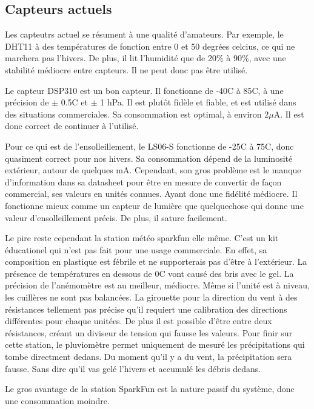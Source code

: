 
\subsection{Capteurs actuels}
Les capteutrs actuel se résument à une qualité d'amateurs.
Par exemple, le DHT11 à des températures de fonction entre 0 et 50 degrées celcius, ce qui ne marchera pas l'hivers.
De plus, il lit l'humidité que de 20\% à 90\%, avec une stabilité médiocre entre capteurs. Il ne peut donc pas être utilisé.

Le capteur DSP310 est un bon capteur. Il fonctionne de -40C à 85C, à une précision de $\pm$ 0.5C et $\pm$ 1 hPa.
Il est plutôt fidèle et fiable, et est utilisé dans des situations commerciales. Sa consommation est optimal, à environ 2$\mu$A.
Il est donc correct de continuer à l'utilisé.

Pour ce qui est de l'ensolleillement, le LS06-S fonctionne de -25C à 75C, donc quasiment correct pour nos hivers. Sa consommation
dépend de la luminosité extérieur, autour de quelques mA. Cependant, son gros problème est le manque d'information dans sa datasheet
pour être en mesure de convertir de façon commercial, ses valeurs en unités connues. Ayant donc une fidélité médiocre.
Il fonctionne mieux comme un capteur de lumière que quelquechose qui donne une valeur d'ensolleillement précis.
De plus, il sature facilement.

Le pire reste cependant la station météo sparkfun elle même. C'est un kit éducationel qui n'est pas fait pour une usage commerciale.
En effet, sa composition en plastique est fébrile et ne supporterais pas d'être à l'extérieur. La présence de températures en dessous
de 0C vont causé des bris avec le gel. La précision de l'anémomètre est au meilleur, médiocre. Même si l'unité est à niveau, les cuillères
ne sont pas balancées. La girouette pour la direction du vent à des résistances tellement pas précise qu'il requiert une calibration 
des directions différentes pour chaque unitées. De plus il est possible d'être entre deux résistances, créant un diviseur de tension qui
fausse les valeurs. Pour finir sur cette station, le pluviomètre permet uniquement de mesuré les précipitations qui tombe directment dedans.
Du moment qu'il y a du vent, la précipitation sera fausse. Sans dire qu'il vas gelé l'hivers et accumulé les débris dedans.

Le gros avantage de la station SparkFun est la nature passif du système, donc une consommation moindre.

